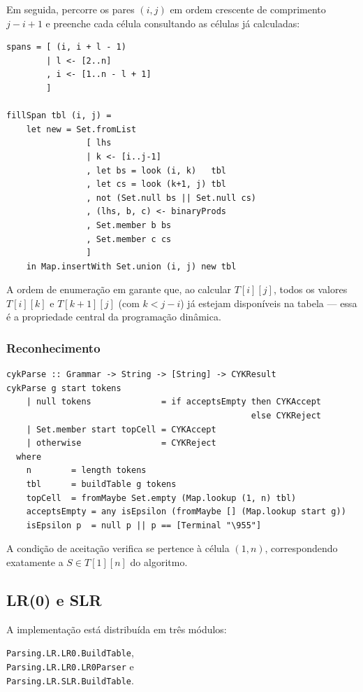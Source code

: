 Em seguida, percorre os pares $(i, j)$ em ordem crescente de comprimento $j - i + 1$ e preenche cada célula consultando as células já calculadas:

\begin{verbatim}
spans = [ (i, i + l - 1)
        | l <- [2..n]
        , i <- [1..n - l + 1]
        ]

fillSpan tbl (i, j) =
    let new = Set.fromList
                [ lhs
                | k <- [i..j-1]
                , let bs = look (i, k)   tbl
                , let cs = look (k+1, j) tbl
                , not (Set.null bs || Set.null cs)
                , (lhs, b, c) <- binaryProds
                , Set.member b bs
                , Set.member c cs
                ]
    in Map.insertWith Set.union (i, j) new tbl
\end{verbatim}

A ordem de enumeração em  garante que, ao calcular $T[i][j]$, todos os valores $T[i][k]$ e $T[k+1][j]$ (com $k < j - i$) já estejam disponíveis na tabela — essa é a propriedade central da programação dinâmica.

\subsubsection{Reconhecimento}

\begin{verbatim}
cykParse :: Grammar -> String -> [String] -> CYKResult
cykParse g start tokens
    | null tokens              = if acceptsEmpty then CYKAccept
                                                 else CYKReject
    | Set.member start topCell = CYKAccept
    | otherwise                = CYKReject
  where
    n        = length tokens
    tbl      = buildTable g tokens
    topCell  = fromMaybe Set.empty (Map.lookup (1, n) tbl)
    acceptsEmpty = any isEpsilon (fromMaybe [] (Map.lookup start g))
    isEpsilon p  = null p || p == [Terminal "\955"]
\end{verbatim}

A condição de aceitação verifica se  pertence à célula $(1, n)$, correspondendo exatamente a $S \in T[1][n]$ do algoritmo.

\subsection{LR(0) e SLR}

A implementação está distribuída em três módulos:
\begin{flushleft}
  \verb|Parsing.LR.LR0.BuildTable|,\\
  \verb|Parsing.LR.LR0.LR0Parser| e\\
  \verb|Parsing.LR.SLR.BuildTable|.
\end{flushleft}

